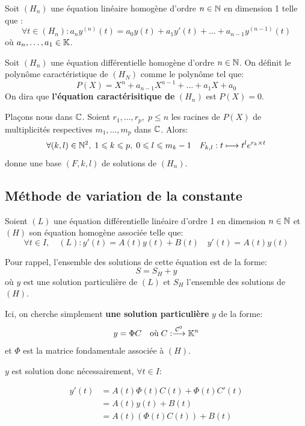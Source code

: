 Soit $(H_n)$ une équation linéaire homogène d'ordre $n \in  \mathbb{N}$ en dimension 1 telle que : 
	\[ \forall t \in (H_n) : a_n y^{(n)}(t) = a_0 y(t) + a_1 y'(t) + \dots + a_{n-1} y^{(n-1)}(t) \]
où $ a_n, \dots, a_1 \in  \mathbb{K}$. 

\begin{definition}
	Soit $(H_n)$ une équation différentielle homogène d'ordre $ n \in  \mathbb{N}$. 
	On définit le polynôme caractéristique de $(H_N)$ comme le polynôme tel que: 
		\[ P(X) = X^n + a_{n-1} X^{n-1} + \dots + a_1 X + a_0 \] 
	On dira que \textbf{l'équation caractérisitique de} $(H_n)$ est $P(X) = 0$. 
\end{definition} 

\begin{theorem} 
	Plaçons nous dans $\mathbb{C}$. Soient $r_1, \dots, r_p, \; p \leqslant n$ les racines de $P(X)$ de multiplicités 
	respectives $m_1, \dots, m_p$ dans $\mathbb{C}$. Alors: 
		\[ \forall (k,l) \in  \mathbb{N}^2, \; 1 \leqslant k \leqslant p, \; 0 \leqslant l \leqslant m_k -1 
			\quad F_{k,l} : t \longmapsto t^l e^{r_k \times t} \]
	donne une base $(F,k,l)$ de solutions de $(H_n)$. 
\end{theorem} 


\subsection{Méthode de variation de la constante} 

Soient $(L)$ une équation différentielle linéaire d'ordre 1 en dimension $n \in  \mathbb{N}$
et $(H)$ son équation homogène associée telle que: 
	\[ \forall t \in I, \quad (L) : y'(t) = A(t) y(t) + B(t) \quad y'(t) = A(t) y(t) \] 

Pour rappel, l'ensemble des solutions de cette équation est de la forme: 
	\[ S = S_H + y \] 
où $y$ est une solution particulière de $(L)$ et $S_H$ l'ensemble des solutions de $(H)$. 

Ici, on cherche simplement \textbf{une solution particulière} $y$ de la forme: 
	\[ y = \Phi C \quad \text{où} \; C : \overset{ \mathcal{C}^0}{\longrightarrow} \mathbb{K}^n \] 
et $\Phi$ est la matrice fondamentale associée à $(H)$. 

$y$ est solution donc nécessairement, $ \forall t \in I$: 

\begin{align*}
	y'(t) &= A(t) \Phi(t) C(t) + \Phi(t) C'(t) \\ 
			&= A(t) y(t) + B(t) \\ 
			&= A(t) \left( \Phi(t) C(t) \right) + B(t)  \\ 
\end{align*}


